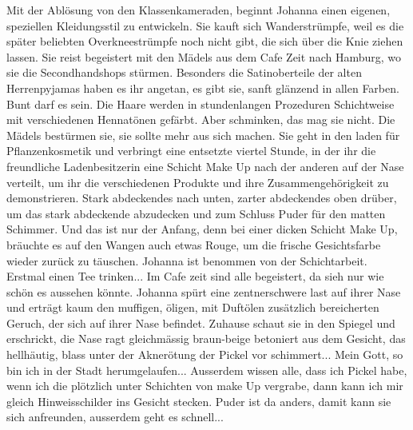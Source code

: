 Mit der Ablösung von den Klassenkameraden, beginnt Johanna einen eigenen, speziellen Kleidungsstil zu entwickeln. Sie kauft sich Wanderstrümpfe, weil es die später beliebten Overkneestrümpfe noch nicht gibt, die sich über die Knie ziehen lassen. Sie reist begeistert mit den Mädels aus dem Cafe Zeit nach Hamburg, wo sie die Secondhandshops stürmen. Besonders die Satinoberteile der alten Herrenpyjamas haben es ihr angetan, es gibt sie, sanft glänzend in allen Farben. 
Bunt darf es sein. Die Haare werden in stundenlangen Prozeduren Schichtweise mit verschiedenen Hennatönen gefärbt. Aber schminken, das mag sie nicht. Die Mädels bestürmen sie, sie sollte mehr aus sich machen. Sie geht in den laden für Pflanzenkosmetik und verbringt eine entsetzte viertel Stunde, in der ihr die freundliche Ladenbesitzerin eine Schicht Make Up nach der anderen auf der Nase verteilt, um ihr die verschiedenen Produkte und ihre Zusammengehörigkeit zu demonstrieren. Stark abdeckendes nach unten, zarter abdeckendes oben drüber, um das stark abdeckende abzudecken und zum Schluss Puder für den matten Schimmer. Und das ist nur der Anfang, denn bei einer dicken Schicht Make Up, bräuchte es auf den Wangen auch etwas Rouge, um die frische Gesichtsfarbe wieder zurück zu täuschen. 
Johanna ist benommen von der Schichtarbeit. Erstmal einen Tee trinken... Im Cafe zeit sind alle begeistert, da sieh nur wie schön es aussehen könnte. Johanna spürt eine zentnerschwere last auf ihrer Nase und erträgt kaum den muffigen, öligen, mit Duftölen zusätzlich bereicherten Geruch, der  sich auf ihrer Nase befindet.
Zuhause schaut sie in den Spiegel und erschrickt, die Nase ragt gleichmässig braun-beige betoniert aus dem Gesicht, das hellhäutig, blass unter der Aknerötung der Pickel vor schimmert... Mein Gott, so bin ich in der Stadt herumgelaufen...
Ausserdem wissen alle, dass ich Pickel habe, wenn ich die plötzlich unter Schichten von make Up vergrabe, dann kann ich mir gleich Hinweisschilder ins Gesicht stecken. Puder ist da anders, damit kann sie sich anfreunden, ausserdem geht es schnell...

